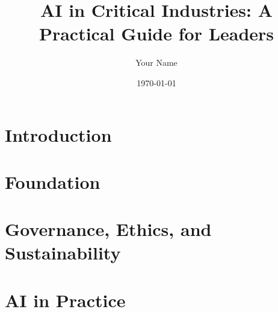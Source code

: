 \documentclass{book}
\title{AI in Critical Industries: A Practical Guide for Leaders}
\author{Your Name}
\date{\today}
\begin{document}
\maketitle

\frontmatter
\tableofcontents

\mainmatter

\part{Introduction}


\part{Foundation}



\part{Governance, Ethics, and Sustainability}






\part{AI in Practice}





\end{document}
